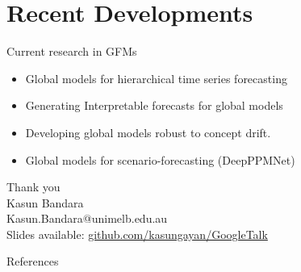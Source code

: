 \documentclass{beamer}
\begin{document}
\section{Recent Developments}


  
 \begin{frame}{Current research in GFMs}
  \begin{itemize}
  		\item Global models for hierarchical time series forecasting 
  		\vspace{2mm}
  		\item Generating Interpretable forecasts for global models
  		\vspace{2mm}
  		\item Developing global models robust to concept drift.
  		\vspace{2mm}
  		\item Global models for scenario-forecasting (DeepPPMNet)
		\end{itemize}
  \end{frame}  


  \begin{frame}
  \begin{center}
  {\Huge Thank you}\vspace{1cm}\\
  Kasun Bandara\vspace{0.2cm}\\
  \textcolor{DiCITSBlue}{Kasun.Bandara@unimelb.edu.au}\vspace{0.8cm}\\
  Slides available: \scriptsize{ \href{https://github.com/kasungayan/GoogleTalk}{github.com/kasungayan/GoogleTalk}}
  \end{center}
\end{frame}

\begin{frame}[allowframebreaks]{References} 
  \scriptsize


\end{frame}
\end{document}
